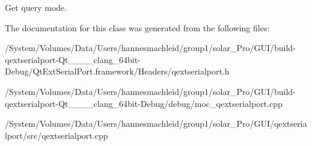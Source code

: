 Get query mode. 

The documentation for this class was generated from the following files\+:\begin{DoxyCompactItemize}
\item 
/\+System/\+Volumes/\+Data/\+Users/hannesmachleid/group1/solar\+\_\+\+Pro/\+G\+U\+I/build-\/qextserialport-\/\+Qt\+\_\+\_\+\_\+\_\+clang\+\_\+64bit-\/\+Debug/\+Qt\+Ext\+Serial\+Port.\+framework/\+Headers/qextserialport.\+h\item 
/\+System/\+Volumes/\+Data/\+Users/hannesmachleid/group1/solar\+\_\+\+Pro/\+G\+U\+I/build-\/qextserialport-\/\+Qt\+\_\+\_\+\_\+\_\+clang\+\_\+64bit-\/\+Debug/debug/moc\+\_\+qextserialport.\+cpp\item 
/\+System/\+Volumes/\+Data/\+Users/hannesmachleid/group1/solar\+\_\+\+Pro/\+G\+U\+I/qextserialport/src/qextserialport.\+cpp\end{DoxyCompactItemize}
